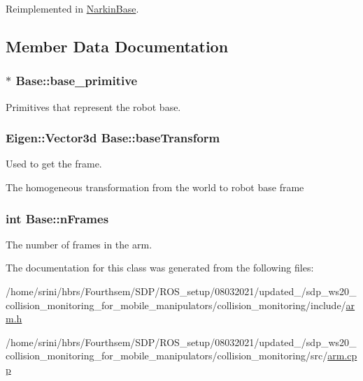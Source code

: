 Reimplemented in \hyperlink{class_narkin_base_abb56af256ebb5c152d0a5c4c3904c66e}{Narkin\+Base}.



\subsection{Member Data Documentation}
\subsubsection[{\texorpdfstring{base\+\_\+primitive}{base_primitive}}]{$\ast$ Base\+::base\+\_\+primitive}\hypertarget{class_base_a662c575c05c933392961e26a6a3d3467}{}\label{class_base_a662c575c05c933392961e26a6a3d3467}


Primitives that represent the robot base. 

\subsubsection[{\texorpdfstring{base\+Transform}{baseTransform}}]{\setlength{\rightskip}{0pt plus 5cm}Eigen\+::\+Vector3d Base\+::base\+Transform}\hypertarget{class_base_a4f5441222a770a86d5c2e653a3936e04}{}\label{class_base_a4f5441222a770a86d5c2e653a3936e04}


Used to get the frame. 

The homogeneous transformation from the world to robot base frame 
\subsubsection[{\texorpdfstring{n\+Frames}{nFrames}}]{\setlength{\rightskip}{0pt plus 5cm}int Base\+::n\+Frames}\hypertarget{class_base_a22cb3f7de315b27b1b2b0b00848c2f4b}{}\label{class_base_a22cb3f7de315b27b1b2b0b00848c2f4b}


The number of frames in the arm. 



The documentation for this class was generated from the following files\+:\begin{DoxyCompactItemize}
\item 
/home/srini/hbrs/\+Fourthsem/\+S\+D\+P/\+R\+O\+S\+\_\+setup/08032021/updated\+\_/sdp\+\_\+ws20\+\_\+collision\+\_\+monitoring\+\_\+for\+\_\+mobile\+\_\+manipulators/collision\+\_\+monitoring/include/\hyperlink{arm_8h}{arm.\+h}\item 
/home/srini/hbrs/\+Fourthsem/\+S\+D\+P/\+R\+O\+S\+\_\+setup/08032021/updated\+\_/sdp\+\_\+ws20\+\_\+collision\+\_\+monitoring\+\_\+for\+\_\+mobile\+\_\+manipulators/collision\+\_\+monitoring/src/\hyperlink{arm_8cpp}{arm.\+cpp}\end{DoxyCompactItemize}
